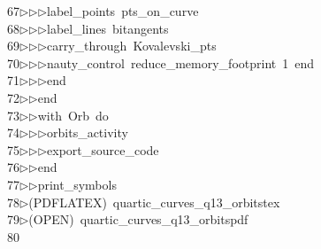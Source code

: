\begin{tabbing}
67\>$\triangleright$\>$\triangleright$\>$\triangleright$\>label\_points\ pts\_on\_curve\ \\[0pt]
68\>$\triangleright$\>$\triangleright$\>$\triangleright$\>label\_lines\ bitangents\ \\[0pt]
69\>$\triangleright$\>$\triangleright$\>$\triangleright$\>carry\_through\ Kovalevski\_pts\ \\[0pt]
70\>$\triangleright$\>$\triangleright$\>$\triangleright$\>nauty\_control\ reduce\_memory\_footprint\ 1\ end\ \\[0pt]
71\>$\triangleright$\>$\triangleright$\>$\triangleright$\>end\ \\[0pt]
72\>$\triangleright$\>$\triangleright$\>end\ \\[0pt]
73\>$\triangleright$\>$\triangleright$\>with\ Orb\ do\ \\[0pt]
74\>$\triangleright$\>$\triangleright$\>$\triangleright$\>orbits\_activity\ \\[0pt]
75\>$\triangleright$\>$\triangleright$\>$\triangleright$\>export\_source\_code\ \\[0pt]
76\>$\triangleright$\>$\triangleright$\>end\ \\[0pt]
77\>$\triangleright$\>$\triangleright$\>print\_symbols\\[0pt]
78\>$\triangleright$\>(PDFLATEX)\ quartic\_curves\_q13\_orbitstex\\[0pt]
79\>$\triangleright$\>(OPEN)\ quartic\_curves\_q13\_orbitspdf\\[0pt]
80\>\end{tabbing}

